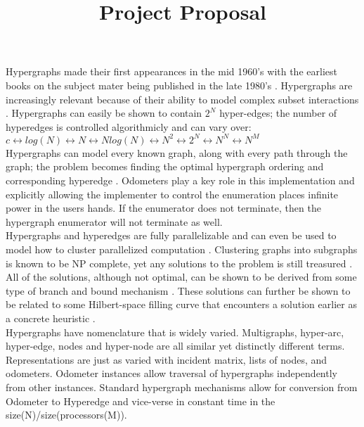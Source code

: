 \documentclass{article}
\title{Project Proposal}
\date{}
\begin{document}
\maketitle
Hypergraphs made their first appearances in the mid 1960's with the earliest books on the subject mater being published in the late 1980's \cite{Berge}. Hypergraphs are increasingly relevant because of their ability to model complex subset interactions \cite{Ritz}. Hypergraphs can easily be shown to contain $2^N$ hyper-edges; the number of hyperedges is controlled algorithmicly and can vary over:\\

$c \leftrightarrow log(N) \leftrightarrow  N \leftrightarrow Nlog(N) \leftrightarrow  N^2 \leftrightarrow  2^N \leftrightarrow  N^N \leftrightarrow  N^M$\\

Hypergraphs can model every known graph, along with every path through the graph; the problem becomes finding the optimal hypergraph ordering and corresponding hyperedge \cite{Ausiello} \cite{Aurelien}. Odometers \cite{Fuchs} play a key role in this implementation and explicitly allowing the implementer to control the enumeration places infinite power in the users hands. If the enumerator does not terminate, then the hypergraph enumerator will not terminate as well. \\

Hypergraphs and hyperedges are fully parallelizable and can even be used to model how to cluster parallelized computation \cite{Molnar} \cite{Zhou} \cite{Devine}.  Clustering graphs into subgraphs is known to be NP complete, yet any solutions to the problem is still treasured \cite{Sun} \cite{ACM} \cite{Satu}.  All of the solutions, although not optimal, can be shown to be derived from some type of branch and bound mechanism \cite{Jens}. These solutions can further be shown to be related to some Hilbert-space filling curve that encounters a solution earlier as a concrete heuristic \cite{Mohamed} \cite{Lawder} \cite{Nielsen}.\\

Hypergraphs have nomenclature that is widely varied. Multigraphs, hyper-arc, hyper-edge, nodes and hyper-node are all similar yet distinctly different terms. Representations are just as varied with incident matrix, lists of nodes, and odometers.  Odometer instances allow traversal of hypergraphs independently from other instances. Standard hypergraph mechanisms allow for conversion from Odometer to Hyperedge and vice-verse in constant time in the size(N)/size(processors(M)).\\
\end{document}

